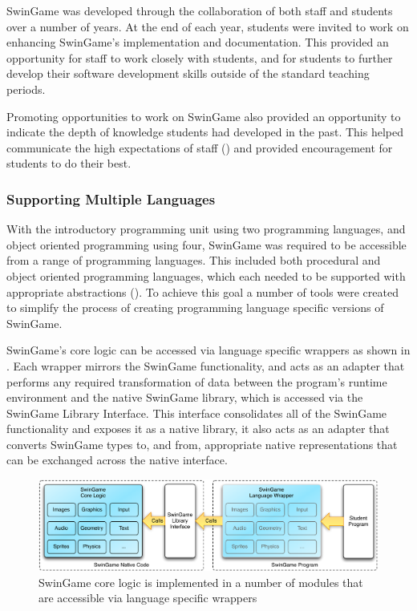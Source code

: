 SwinGame was developed through the collaboration of both staff and students over a number of years. At the end of each year, students were invited to work on enhancing SwinGame's implementation and documentation. This provided an opportunity for staff to work closely with students, and for students to further develop their software development skills outside of the standard teaching periods.

Promoting opportunities to work on SwinGame also provided an opportunity to indicate the depth of knowledge students had developed in the past. This helped communicate the high expectations of staff () and provided encouragement for students to do their best.


\subsubsection{Supporting Multiple Languages} %
\label{sub:supporting_multiple_languages}

With the introductory programming unit using two programming languages, and object oriented programming using four, SwinGame was required to be accessible from a range of programming languages. This included both procedural and object oriented programming languages, which each needed to be supported with appropriate abstractions (). To achieve this goal a number of tools were created to simplify the process of creating programming language specific versions of SwinGame.

SwinGame's core logic can be accessed via language specific wrappers as shown in . Each wrapper mirrors the SwinGame functionality, and acts as an adapter that performs any required transformation of data between the program's runtime environment and the native SwinGame library, which is accessed via the SwinGame Library Interface. This interface consolidates all of the SwinGame functionality and exposes it as a native library, it also acts as an adapter that converts SwinGame types to, and from, appropriate native representations that can be exchanged across the native interface. 

\begin{figure}[thbp]
  \centering
  \includegraphics[width=\textwidth]{SwinGameArch}
  \caption{SwinGame core logic is implemented in a number of modules that are accessible via language specific wrappers }
  \label{fig:swingame_arch}
\end{figure}

